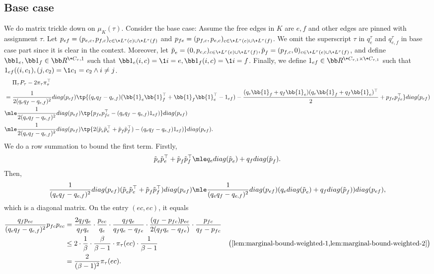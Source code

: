 \documentclass[a4paper,11pt]{article}
\begin{document}
\subsection{Base case}\label{sec:base-case}
\newcommand{\revp}{\tilde{\*p}}
We do matrix trickle down on $\mu_K(\tau)$.
Consider the base case: Assume the free edges in $K$ are $e,f$ and other edges are pinned with assignment $\tau$. 
Let $\*p_{ef}=(p_{e,c},p_{f,c})_{c\in \+L^\tau(e)\cup \+L^\tau(f)}$ and $\*p_{fe}=(p_{f,c},p_{e,c})_{c\in \+L^\tau(e)\cup \+L^\tau(f)}$. We omit the superscript $\tau$ in $q_e^\tau$ and $q_{e,f}^\tau$ in base case part since it is clear in the context.
Moreover, let $\revp_e=(0, p_{e, c})_{c\in \+L^\tau(e)\cup \+L^\tau(f)}, \revp_f = (p_{f, c}, 0)_{c\in \+L^\tau(e)\cup \+L^\tau(f)}$,
and define $\bb 1_e, \bb 1_f\in \bb R^{\+C_\tau, 1}$ such that $\bb 1_e(i, c) = \1{i=e},\bb 1_f(i, c) = \1{i=f}$.
Finally, we define $\*1_{ef}\in \bb R^{\+C_{\tau, 1}\times \+C_{\tau, 1}}$ such that $\*1_{ef}((i, c_1), (j, c_2) = \1{c_1=c_2\wedge i\neq j}$.
\begin{align*}
    &\phantom{{}={}}\Pi_\tau P_\tau- 2\pi_\tau\pi_\tau^\top 
    \\
    &= \frac{1}{2(q_eq_f-q_{e,f})^2}\-{diag}(\*p_{ef})\tp{(q_eq_f-q_{e,f})(\bb{1}_e\bb{1}_f^\top + \bb{1}_f\bb{1}_e^\top-\*1_{ef})-\frac{(q_e\bb{1}_f+q_f\bb{1}_e)(q_e\bb{1}_f+q_f\bb{1}_e)^\top}{2}+\*p_{fe}\*p_{fe}^\top} \-{diag}(\*p_{ef})\\
    &\mle \frac{1}{2(q_eq_f-q_{e,f})^2}\-{diag}(\*p_{ef})\tp{\*p_{fe}\*p_{fe}^\top-(q_eq_f-q_{e,f})\*1_{ef})} \-{diag}(\*p_{ef})\\
    &\mle \frac{1}{2(q_eq_f-q_{e,f})^2}\-{diag}(\*p_{ef})\tp{2(\revp_{e}\revp_{e}^\top+\revp_{f}\revp_{f}^\top)-(q_eq_f-q_{e,f})\*1_{ef})} \-{diag}(\*p_{ef}) .
\end{align*}
We do a row summation to bound the first term. Firstly,
\begin{align*}
    \revp_{e}\revp_{e}^\top+\revp_{f}\revp_{f}^\top \mle q_e\-{diag}(\revp_e) + q_f\-{diag}(\revp_f).
\end{align*}
Then,
\begin{align*}
    \frac{1}{(q_eq_f-q_{e,f})^2}\-{diag}(\*p_{ef})(\revp_{e}\revp_{e}^\top+\revp_{f}\revp_{f}^\top)\-{diag}(\*p_{ef})
    \mle \frac{1}{(q_eq_f-q_{e,f})^2}\-{diag}(\*p_{ef})(q_e\-{diag}(\revp_e) + q_f\-{diag}(\revp_f))\-{diag}(\*p_{ef}),
\end{align*}
which is a diagonal matrix.
On the entry $(ec, ec)$, it equals
\begin{align*}
    \frac{q_fp_{ec}}{(q_eq_f-q_{e,f})^2}p_{fc}p_{ec}
   &=       \frac{2q_fq_e}{q_fq_e}
      \cdot \frac{p_{ec}}{q_e}
      \cdot \frac{q_fq_e}{q_fq_e-q_{fe}}
      \cdot \frac{(q_f-p_{fc})p_{ec}}{2(q_fq_e-q_{fe})}
      \cdot \frac{p_{fc}}{q_f-p_{fc}}
    \\&\le
            2
      \cdot \frac1\beta
      \cdot \frac{\beta}{\beta-1}
      \cdot \pi_\tau(ec)
      \cdot \frac{1}{\beta-1}
      & \text{\big(\Cref{lem:marginal-bound-weighted-1,lem:marginal-bound-weighted-2}\big)}
    \\&=\frac{2}{(\beta-1)^2}\pi_\tau(ec).
\end{align*}
\end{document}
